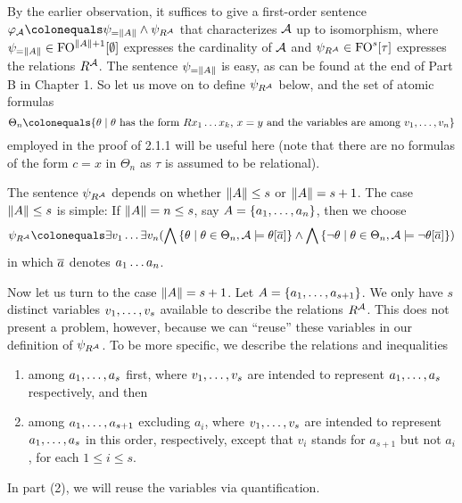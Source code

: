 \begin{enumerate}[1.]
\begin{enumerate}[(a)]
By the earlier observation, it suffices to give a first-order sentence $\varphi_\strct{A} \defas \psi_{= \card{A}} \land \psi_{\intpr{R}{\strct{A}}}$ that characterizes $\mathcal{A}$ up to isomorphism, where $\psi_{= \card{A}} \in \folog[\card{A} + 1]\of{\emptyset}$ expresses the cardinality of $\mathcal{A}$ and $\psi_{\intpr{R}{\strct{A}}} \in \folog[s]\of{\tau}$ expresses the relations $R^{\mathcal{A}}$. The sentence $\psi_{= \|A\|}$ is easy, as can be found at the end of Part B in Chapter 1. So let us move on to define $\psi_{R^{\mathcal{A}}}$ below, and the set of atomic formulas
\[
\Theta_n \defas \sett{\theta}{\mathmode{\theta} has the form \mathmode{Rx_1 \etc x_k}, \mathmode{x = y} and the variables are among \mathmode{v_1, \etc, v_n}}
\]
employed in the proof of 2.1.1 will be useful here (note that there are no formulas of the form $c = x$ in $\Theta_n$ as $\tau$ is assumed to be relational).

The sentence $\psi_{R^{\mathcal{A}}}$ depends on whether $\|A\| \leq s$ or $\|A\| = s + 1$. The case $\|A\| \leq s$ is simple: If $\|A\| = n \leq s$, say $A = {\{a_1, \ldots, a_n\}}$, then we choose
\[
\psi_{\intpr{R}{\strct{A}}} \defas \exists v_1 \etc \exists v_n (\bland\setm{\theta}{\theta \in \Theta_n, \strct{A} \satis \theta[\vect{a}]} \land \bland\setm{\neg\theta}{\theta \in \Theta_n, \strct{A} \satis \neg\theta[\vect{a}]})
\]
in which $\overline{a}$ denotes $a_1 \ldots a_n$.

Now let us turn to the case $\|A\| = s + 1$. Let $A = {\{a_1, \ldots, a_{s + 1}\}}$. We only have $s$ distinct variables $v_1, \ldots, v_s$ available to describe the relations $R^{\mathcal{A}}$. This does not present a problem, however, because we can ``reuse'' these variables in our definition of $\psi_{R^{\mathcal{A}}}$. To be more specific, we describe the relations and inequalities
\begin{enumerate}[(1)]
\item among $a_1, \ldots, a_s$ first, where $v_1, \ldots, v_s$ are intended to represent $a_1, \ldots, a_s$ respectively, and then
\item among $a_1, \ldots, a_{s + 1}$ excluding $a_i$, where $v_1, \ldots, v_s$ are intended to represent $a_1, \ldots, a_s$ in this order, respectively, except that $v_i$ stands for $a_{s + 1}$ but not $a_i$, for each $1 \leq i \leq s$.
\end{enumerate}
In part (2), we will reuse the variables via quantification.


\end{enumerate}
\end{enumerate}
